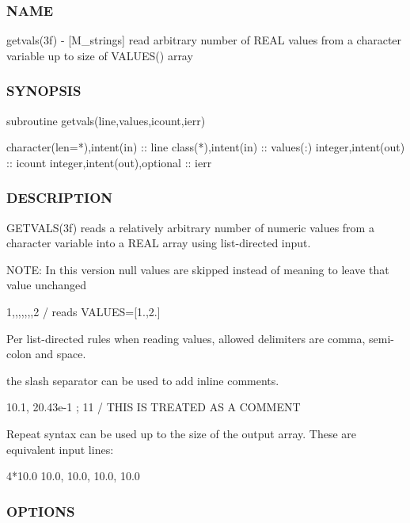 \subsubsection*{N\+A\+ME}

getvals(3f) -\/ \mbox{[}M\+\_\+strings\mbox{]} read arbitrary number of R\+E\+AL values from a character variable up to size of V\+A\+L\+U\+E\+S() array 

\subsubsection*{S\+Y\+N\+O\+P\+S\+IS}

\begin{DoxyVerb}subroutine getvals(line,values,icount,ierr)

 character(len=*),intent(in)  :: line
 class(*),intent(in)          :: values(:)
 integer,intent(out)          :: icount
 integer,intent(out),optional :: ierr
\end{DoxyVerb}


\subsubsection*{D\+E\+S\+C\+R\+I\+P\+T\+I\+ON}

G\+E\+T\+V\+A\+L\+S(3f) reads a relatively arbitrary number of numeric values from a character variable into a R\+E\+AL array using list-\/directed input.

N\+O\+TE\+: In this version null values are skipped instead of meaning to leave that value unchanged

1,,,,,,,2 / reads V\+A\+L\+U\+ES=\mbox{[}1.,2.\mbox{]}

Per list-\/directed rules when reading values, allowed delimiters are comma, semi-\/colon and space.

the slash separator can be used to add inline comments. \begin{DoxyVerb} 10.1, 20.43e-1 ; 11 / THIS IS TREATED AS A COMMENT
\end{DoxyVerb}


Repeat syntax can be used up to the size of the output array. These are equivalent input lines\+: \begin{DoxyVerb} 4*10.0
 10.0, 10.0, 10.0, 10.0
\end{DoxyVerb}


\subsubsection*{O\+P\+T\+I\+O\+NS}

